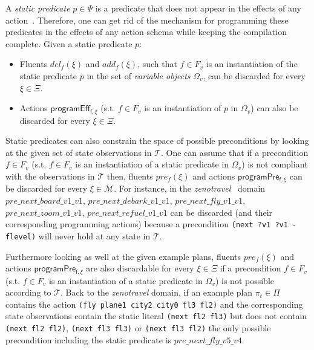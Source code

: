 A {\em static predicate} $p \in \Psi$ is a predicate that does not appear in the effects of any action~\cite{fox:TIM:JAIR1998}. Therefore, one can get rid of the mechanism for programming these predicates in the effects of any action schema while keeping the compilation complete. Given a static predicate $p$:
\begin{itemize}
\item Fluents $del_f(\xi)$ and $add_f(\xi)$, such that $f\in F_v$ is an instantiation of the static predicate $p$ in the set of {\em variable objects} $\Omega_v$, can be discarded for every $\xi\in\Xi$.
\item Actions $\mathsf{programEff_{f,\xi}}$ (s.t. $f\in F_v$ is an instantiation of $p$ in $\Omega_v$) can also be discarded for every $\xi\in\Xi$.
\end{itemize}

Static predicates can also constrain the space of possible preconditions by looking at the given set of state observations in $\mathcal{T}$. One can assume that if a precondition $f\in F_v$ (s.t. $f\in F_v$ is an instantiation of a static predicate in $\Omega_v$) is not compliant with the observations in $\mathcal{T}$ then, fluents $pre_f(\xi)$ and actions $\mathsf{programPre_{f,\xi}}$ can be discarded for every $\xi\in\mathcal{M}$. For instance, in the {\em zenotravel}~\cite{long20033rd} domain $pre\_next\_board\_v1\_v1$, $pre\_next\_debark\_v1\_v1$, $pre\_next\_fly\_v1\_v1$, $pre\_next\_zoom\_v1\_v1$, $pre\_next\_refuel\_v1\_v1$ can be discarded (and their corresponding programming actions) because a precondition {\tt\small(next ?v1 ?v1 - flevel)} will never hold at any state in $\mathcal{T}$.

Furthermore looking as well at the given example plans, fluents $pre_f(\xi)$ and actions $\mathsf{programPre_{f,\xi}}$ are also discardable for every $\xi\in\Xi$ if a precondition $f\in F_v$ (s.t. $f\in F_v$ is an instantiation of a static predicate in $\Omega_v$) is not possible according to $\mathcal{T}$. Back to the {\em zenotravel} domain, if an example plan $\pi_t\in \Pi$ contains the action {\tt\small (fly plane1 city2 city0 fl3 fl2)} and the corresponding state observations contain the static literal {\tt\small (next fl2 fl3)} but does not contain {\tt\small (next fl2 fl2)}, {\tt\small (next fl3 fl3)} or {\tt\small (next fl3 fl2)} the only possible precondition including the static predicate is $pre\_next\_fly\_v5\_v4$.

